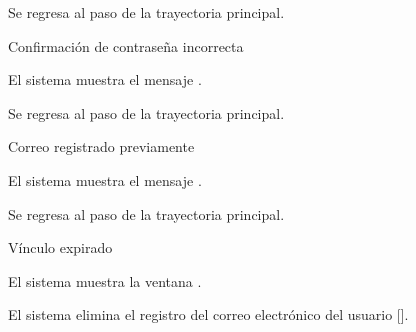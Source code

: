 {\begin{trayectoriaAlternativa}
    \item Se regresa al paso  de la trayectoria
      principal.

  \end{trayectoriaAlternativa}

  \begin{trayectoriaAlternativa}
    {Confirmación de contraseña incorrecta}

    \item El sistema muestra el mensaje
      .

    \item Se regresa al paso  de la trayectoria
      principal.

  \end{trayectoriaAlternativa}

  \begin{trayectoriaAlternativa}
    {Correo registrado previamente}

    \item El sistema muestra el mensaje
      .

    \item Se regresa al paso  de la trayectoria
      principal.

  \end{trayectoriaAlternativa}

  \begin{trayectoriaAlternativa}
    {Vínculo expirado}

    \item El sistema muestra la ventana
      .

    \item El sistema elimina el registro del correo electrónico del usuario
      [].

  \end{trayectoriaAlternativa}

}
